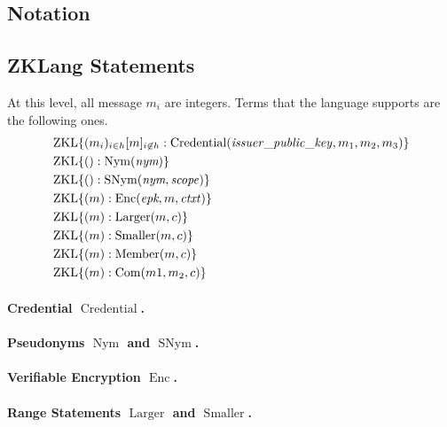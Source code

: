 
\subsection{Notation}


\subsection{ZKLang Statements}

At this level, all message $m_i$ are integers.
Terms that the language supports are the following ones.
\begin{align}
&\operatorname{ZKL}\lbrace(m_i)_{i\in h}[m]_{i\not\in h}: \operatorname{Credential}( \mathit{issuer\_public\_key}, m_1, m_2, m_3) \rbrace\\
&\operatorname{ZKL}\lbrace(): \operatorname{Nym}( \emph{nym}) \rbrace\\
&\operatorname{ZKL}\lbrace(): \operatorname{SNym}( \emph{nym}, \mathit{scope}) \rbrace\\
&\operatorname{ZKL}\lbrace(m): \operatorname{Enc}( \emph{epk}, m, \mathit{ctxt}) \rbrace\\
&\operatorname{ZKL}\lbrace(m): \operatorname{Larger}(m, c) \rbrace\\
&\operatorname{ZKL}\lbrace(m): \operatorname{Smaller}(m, c) \rbrace \\
&\operatorname{ZKL}\lbrace(m): \operatorname{Member}(m, c) \rbrace \\
&\operatorname{ZKL}\lbrace(m): \operatorname{Com}(m1, m_2, c) \rbrace
\end{align}

\paragraph{Credential $\operatorname{Credential}$.}

\paragraph{Pseudonyms $\operatorname{Nym}$ and $\operatorname{SNym}$.}

\paragraph{Verifiable Encryption  $\operatorname{Enc}$.}

\paragraph{Range Statements $\operatorname{Larger}$ and $\operatorname{Smaller}$.}

